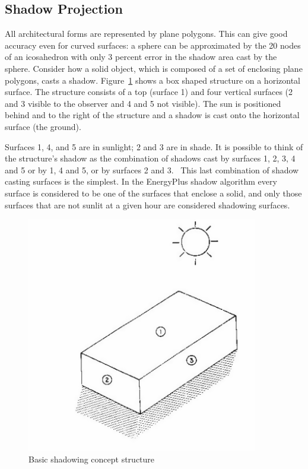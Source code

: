 \subsection{Shadow Projection}\label{shadow-projection}

All architectural forms are represented by plane polygons. This can give good accuracy even for curved surfaces: a sphere can be approximated by the 20 nodes of an icosahedron with only 3 percent error in the shadow area cast by the sphere. Consider how a solid object, which is composed of a set of enclosing plane polygons, casts a shadow. Figure~\ref{fig:basic-shadowing-concept-structure} shows a box shaped structure on a horizontal surface. The structure consists of a top (surface 1) and four vertical surfaces (2 and 3 visible to the observer and 4 and 5 not visible). The sun is positioned behind and to the right of the structure and a shadow is cast onto the horizontal surface (the ground).

Surfaces 1, 4, and 5 are in sunlight; 2 and 3 are in shade. It is possible to think of the structure's shadow as the combination of shadows cast by surfaces 1, 2, 3, 4 and 5 or by 1, 4 and 5, or by surfaces 2 and 3.~ This last combination of shadow casting surfaces is the simplest. In the EnergyPlus shadow algorithm every surface is considered to be one of the surfaces that enclose a solid, and only those surfaces that are not sunlit at a given hour are considered shadowing surfaces.

\begin{figure}[hbtp] %
\centering
\includegraphics[width=0.9\textwidth, height=0.9\textheight, keepaspectratio=true]{media/image622.png}
\caption{Basic shadowing concept structure \protect \label{fig:basic-shadowing-concept-structure}}
\end{figure}

